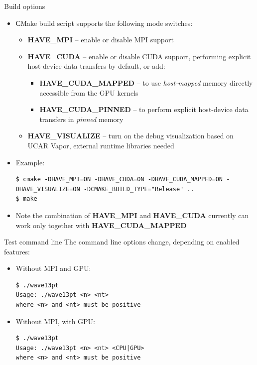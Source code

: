 \documentclass{beamer}
\begin{document}
\begin{frame}[fragile]{Build options}
\begin{itemize}
\item[] СMake build script supports the following mode switches:
\begin{itemize}
\item \textbf{HAVE\_MPI} -- enable or disable MPI support 
\item \textbf{HAVE\_CUDA} -- enable or disable CUDA support, performing explicit host-device data transfers by default, or add:
\begin{itemize}
\item \textbf{HAVE\_CUDA\_MAPPED} -- to use \emph{host-mapped} memory directly accessible from the GPU kernels
\item \textbf{HAVE\_CUDA\_PINNED} -- to perform explicit host-device data transfers in \emph{pinned} memory
\end{itemize}
\item \textbf{HAVE\_VISUALIZE} -- turn on the debug visualization based on UCAR Vapor, external runtime libraries needed
\end{itemize}
\item[] Example:
\begin{lstlisting}
$ cmake -DHAVE_MPI=ON -DHAVE_CUDA=ON -DHAVE_CUDA_MAPPED=ON -DHAVE_VISUALIZE=ON -DCMAKE_BUILD_TYPE="Release" ..
$ make
\end{lstlisting}
\item[] Note the combination of \textbf{HAVE\_MPI} and \textbf{HAVE\_CUDA} currently can work only together with \textbf{HAVE\_CUDA\_MAPPED}
\end{itemize}
\end{frame}

\begin{frame}[fragile]{Test command line}
The command line options change, depending on enabled features:
\begin{itemize}
\item Without MPI and GPU:
\begin{lstlisting}
$ ./wave13pt
Usage: ./wave13pt <n> <nt>
where <n> and <nt> must be positive
\end{lstlisting}
\item Without MPI, with GPU:
\begin{lstlisting}
$ ./wave13pt
Usage: ./wave13pt <n> <nt> <CPU|GPU>
where <n> and <nt> must be positive
\end{lstlisting}
\end{itemize}
\end{frame}
\end{document}
